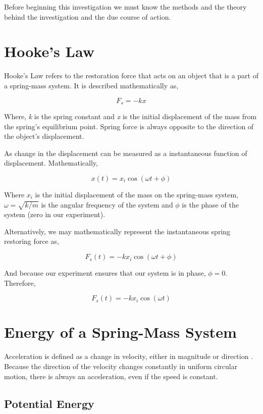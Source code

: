 {Before beginning this investigation we must know the methods and the theory behind the investigation and the due course of action.}

\section{{Hooke's Law}}

	{Hooke's Law refers to the restoration force that acts on an object that is a part of a spring-mass system. It is described mathematically as,}

		$$F_{s} = -kx$$

	{Where, \textit{k} is the spring constant and \textit{x} is the initial displacement of the mass from the spring's equilibrium point. Spring force is always opposite to the direction of the object's displacement.}

	{As change in the displacement can be measured as a instantaneous function of displacement. Mathematically,}

		$$x\left(t\right) = x_{i}\cos{\left(\omega t + \phi\right)}$$

	{Where $x_{i}$ is the initial displacement of the mass on the spring-mass system, $\omega = \sqrt{k/m}$ is the angular frequency of the system and $\phi$ is the phase of the system (zero in our experiment).}

	{Alternatively, we may mathematically represent the instantaneous spring restoring force as,}

		$$F_{s}\left(t\right) = -kx_{i}\cos{\left(\omega t + \phi\right)}$$
		
	{And because our experiment ensures that our system is in phase, $\phi = 0$. Therefore,}		
		
		$$F_{s}\left(t\right) = -kx_{i}\cos{\left(\omega t\right)}$$
		
\section{{Energy of a Spring-Mass System}}

	{Acceleration is defined as a change in velocity, either in magnitude or direction . Because the direction of the velocity changes constantly in uniform circular motion, there is always an acceleration, even if the speed is constant.}
	
	\subsection{{Potential Energy}}
	
